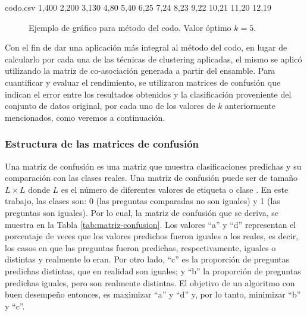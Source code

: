 \begin{filecontents*}{codo.csv}
1,400
2,200
3,130
4,80
5,40
6,25
7,24
8,23
9,22
10,21
11,20
12,19
\end{filecontents*}

\begin{figure}
	\centering
	\scriptsize
	\caption{Ejemplo de gráfico para método del codo. Valor óptimo \(k = 5\).}
	\label{fig:codo}
\end{figure}

\bigskip Con el fin de dar una aplicación más integral al método del codo, en lugar de calcularlo por cada una de las técnicas de clustering aplicadas, el mismo se aplicó utilizando la matriz de co-asociación generada a partir del ensamble. Para cuantificar y evaluar el rendimiento, se utilizaron matrices de confusión que indican el error entre los resultados obtenidos y la clasificación proveniente del conjunto de datos original, por cada uno de los valores de \(k\) anteriormente mencionados, como veremos a continuación.

\subsubsection{Estructura de las matrices de confusión}\label{estructurasconfusion}
Una matriz de confusión es una matriz que muestra clasificaciones predichas y su comparación con las clases reales. Una matriz de confusión puede ser de tamaño \(L \times L\) donde \(L\) es el número de diferentes valores de etiqueta o clase \citep{provost1998glossary}. En este trabajo, las clases son: 0 (las preguntas comparadas no son iguales) y 1 (las preguntas son iguales). Por lo cual, la matriz de confusión que se deriva, se muestra en la Tabla \ref{tab:matriz-confusion}. Los valores “a” y “d” representan el porcentaje de veces que los valores predichos fueron iguales a los reales, es decir, los casos en que las preguntas fueron predichas, respectivamente, iguales o distintas y realmente lo eran. Por otro lado, “c” es la proporción de preguntas predichas distintas, que en realidad son iguales; y “b” la proporción de preguntas predichas iguales, pero son realmente distintas. El objetivo de un algoritmo con buen desempeño entonces, es maximizar “a” y “d” y, por lo tanto, minimizar “b” y “c”.

